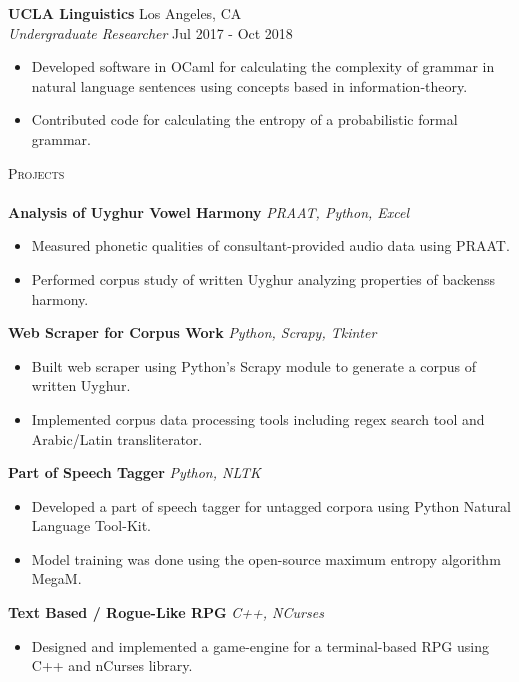 \documentclass[]{article}
\newcommand{\lineunder} {
    \vspace*{-8pt} \\
    \hspace*{-18pt} \hrulefill \\
}
\newcommand{\header} [1] {
    {\hspace*{-18pt}\vspace*{6pt} \textsc{#1}}
    \vspace*{-6pt} \lineunder
}
\begin{document}
\textbf{UCLA Linguistics} \hfill Los Angeles, CA\\
\textit{Undergraduate Researcher} \hfill Jul 2017 - Oct 2018\\
\vspace{-3mm}
\begin{itemize} \itemsep 0pt
	\item Developed software in OCaml for calculating the complexity of grammar in natural language sentences using concepts based in information-theory.
	\item Contributed code for calculating the entropy of a probabilistic formal grammar.
\end{itemize}

\header{Projects}
{\textbf{Analysis of Uyghur Vowel Harmony}} \hspace*{5mm} {\sl PRAAT, Python, Excel}
\vspace*{-5pt}\begin{itemize}	\itemsep 0pt 
	\item Measured phonetic qualities of consultant-provided audio data using PRAAT.
	\item Performed corpus study of written Uyghur analyzing properties of backenss harmony.
\end{itemize}
\vspace*{0mm}

{\textbf{Web Scraper for Corpus Work}} \hspace*{5mm} {\sl Python, Scrapy, Tkinter}
\vspace*{-5pt}\begin{itemize}	\itemsep 0pt 
	\item Built web scraper using Python's Scrapy module to generate a corpus of written Uyghur.
	\item Implemented corpus data processing tools including regex search tool and Arabic/Latin transliterator.
\end{itemize}
\vspace*{0mm}


{\textbf{Part of Speech Tagger}} \hspace*{5mm} {\sl Python, NLTK} \\
\vspace*{-5pt}\begin{itemize}	\itemsep 0pt
	\item Developed a part of speech tagger for untagged corpora using Python Natural Language Tool-Kit.
	\item Model training was done using the open-source maximum entropy algorithm MegaM.
\end{itemize}
\vspace*{0mm}
{\textbf{Text Based / Rogue-Like RPG}} \hspace*{5mm} {\sl C++, NCurses} \\
\vspace*{-5pt}\begin{itemize}	\itemsep 0pt
	\item Designed and implemented a game-engine for a terminal-based RPG using C++ and nCurses library.
\end{itemize}
\vspace*{0mm}
\end{document}
